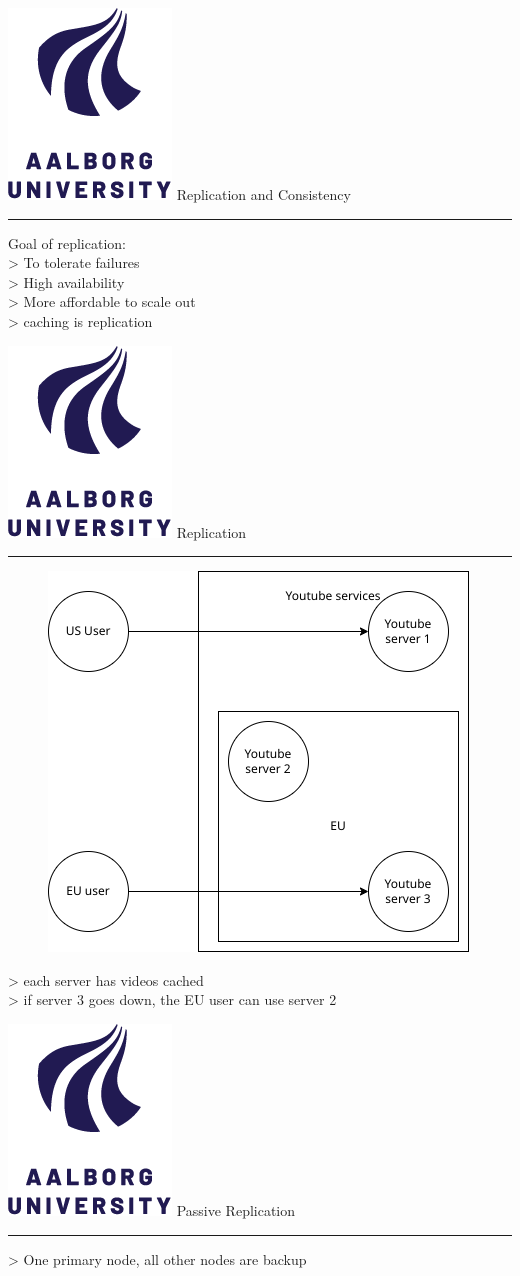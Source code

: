 \documentclass[aspectratio=1610,17pt,utf8]{beamer}
\newcommand{\mainframe}[1]{\color{blue} \includegraphics[width=.05\textwidth]{figures/aau.png} #1\\\color{black}\hrule}
\newcommand{\regularframe}[1]{\color{black}\includegraphics[width=.05\textwidth]{figures/aau.png} #1\\\hrule}
\begin{document}
\begin{frame}{\mainframe{Replication and Consistency}}
    Goal of replication:\\
    > To tolerate failures\\
    > High availability\\
    > More affordable to scale out\\
    > caching is replication
\end{frame}

\begin{frame}{\regularframe{Replication}}
    \begin{minipage}{.45\textwidth}
        \begin{figure}
            \includegraphics[width=\textwidth]{figures/4-replication.drawio.png}
        \end{figure}
    \end{minipage}
    \begin{minipage}{.5\textwidth}
        > each server has videos cached\\
        > if server 3 goes down, the EU user can use server 2
    \end{minipage}
\end{frame}

\begin{frame}{\regularframe{Passive Replication}}
    > One primary node, all other nodes are backup
\end{frame}
\end{document}
